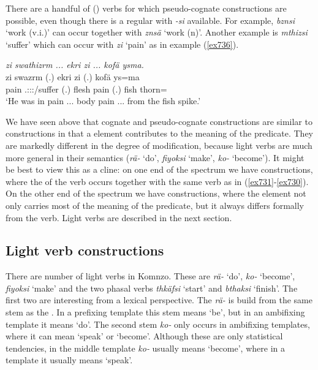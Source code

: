 There are a handful of () verbs for which pseudo-cognate constructions are possible, even though there is a regular  with \emph{-si} available. For example, \emph{bznsi} `work (v.i.)' can occur together with \emph{znsä} `work (n)'. Another example is \emph{mthizsi} `suffer' which can occur with \emph{zi} `pain' as in example (\ref{ex736}).

\begin{exe}
	\ex \emph{zi swathizrm ... ekri zi ... kofä ysma.}\\
	\gll zi swazrm (.) ekri zi (.) kofä ys=ma\\
	pain \Tsg.\Masc:\Sbj:\Pst:\Dur/suffer (.) flesh pain (.) fish thorn=\Char\\
	\trans `He was in pain ... body pain ... from the fish spike.'
	\label{ex736}
\end{exe}

We have seen above that cognate and pseudo-cognate constructions are similar to  constructions in that a  element contributes to the meaning of the predicate. They are markedly different in the degree of modification, because light verbs are much more general in their semantics (\emph{rä-} `do', \emph{fiyoksi} `make', \emph{ko-} `become'). It might be best to view this as a cline: on one end of the spectrum we have  constructions, where the  of the verb occurs together with the same verb as in (\ref{ex731}-\ref{ex730}). On the other end of the spectrum we have  constructions, where the  element not only carries most of the meaning of the predicate, but it always differs formally from the verb. Light verbs are described in the next section.

\subsection{Light verb constructions}\label{lightverb}

There are number of light verbs in Komnzo. These are \emph{rä-} `do', \emph{ko-} `become', \emph{fiyoksi} `make' and the two phasal verbs \emph{thkäfsi} `start' and \emph{bthaksi} `finish'. The first two are interesting from a lexical perspective. The  \emph{rä-} is build from the same stem as the . In a prefixing template this stem means `be', but in an ambifixing template it means `do'. The second stem \emph{ko-} only occurs in ambifixing templates, where it can mean `speak' or `become'. Although these are only statistical tendencies, in the middle template \emph{ko-} usually means `become', where in a  template it usually means `speak'.\\


